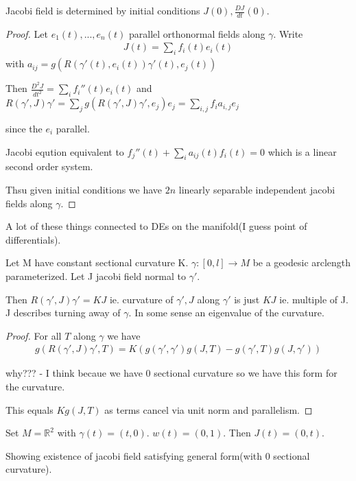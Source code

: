 \documentclass[11pt]{article}
\newcommand{\R}{\mathbb{R}}
\begin{document}
\begin{prop}
	Jacobi field is determined by initial conditions $J(0),\frac{DJ}{dt}(0)$. 
\end{prop}

\begin{proof}
	Let $e_1(t),...,e_n(t)$ parallel orthonormal fields along $\gamma$. Write
	\begin{align*}
		J(t) = \sum_i f_i(t) e_i(t)
	\end{align*}
	with $a_{ij} = g(R(\gamma'(t),e_i(t))\gamma'(t),e_j(t))$

	Then $\frac{D^2 J}{dt^2} = \sum_i f_i''(t)e_i(t)$ and $R(\gamma',J)\gamma' = \sum_j g(R(\gamma',J)\gamma',e_j)e_j = \sum_{i,j} f_i a_{i,j}e_j$

	since the $e_i$ parallel.

	Jacobi eqution equivalent to $f_j''(t) + \sum_i a_{ij}(t)f_i(t) = 0$ which is a linear second order system.

	Thsu given initial conditions we have $2n$ linearly separable independent jacobi fields along $\gamma$. 
\end{proof}

\begin{theme}
	A lot of these things connected to DEs on the manifold(I guess point of differentials).
\end{theme}

\begin{prop}
	Let M have constant sectional curvature K. $\gamma : [0,l] \to M$ be a geodesic arclength parameterized. Let J jacobi field normal to $\gamma'$. 

	Then $R(\gamma',J)\gamma' = KJ$ ie. curvature of $\gamma',J$ along $\gamma'$ is just $KJ$ ie. multiple of J. J describes turning away of $\gamma$. In some sense an eigenvalue of the curvature. 
\end{prop}

\begin{proof}
	For all $T$ along $\gamma$ we have
	\begin{align*}
		g(R(\gamma',J)\gamma',T) = K(g(\gamma',\gamma')g(J,T) - g(\gamma',T)g(J,\gamma'))
	\end{align*}

	why??? - I think becaue we have 0 sectional curvature so we have this form for the curvature.

	This equals $Kg(J,T)$ as terms cancel via unit norm and parallelism.
\end{proof}

\begin{example}
	Set $M = \R^2$ with $\gamma(t) = (t,0)$. $w(t) = (0,1)$. Then $J(t) = (0,t)$. 

	Showing existence of jacobi field satisfying general form(with 0 sectional curvature).
\end{example}
\end{document}
